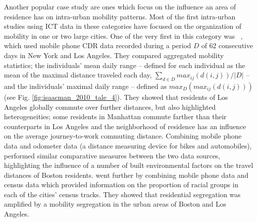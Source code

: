 Another popular case study are ones which
focus on the influence an area of residence has on intra-urban
mobility patterns. Most of the first intra-urban studies using ICT
data in these categories have focused on the organization of mobility
in one or two large cities. One of the very first in this category was
~\cite{isaacman_2010_tale}, which used mobile phone CDR data recorded
during a period $D$ of 62 consecutive days in New York and Los
Angeles. They compared aggregated mobility statistics; the
individuals' mean daily range -- defined for each individual as the mean
of the maximal distance traveled each day, $\sum_{d \in
D}{max_{ij}(d(i,j))}/|D|$ -- and the individuals' maximal daily range
-- defined as $max_D(max_{ij}(d(i,j)))$ (see Fig. \ref{fig:isaacman_2010_tale_4}). They showed that residents of
Los Angeles globally commute over further distances, but also
highlighted heterogeneities; some residents in Manhattan commute
farther than their counterparts in Los Angeles and
the neighborhood of residence has an influence on the average journey-to-work commuting
distance. 
%
Combining mobile phone data and odometer data (a distance measuring device for bikes and automobiles),
\cite{calabrese_2013_understanding} performed similar comparative
measures between the two data sources, highlighting the influence of a
number of built environmental factors on the travel distances
of Boston residents. \cite{desu_2016_effects} went further by
combining mobile phone data and census data which provided information on the
proportion of racial groups in each of the cities' census tracks. They
showed that residential segregation was amplified by a mobility
segregation in the urban areas of Boston and Los Angeles. 
%

